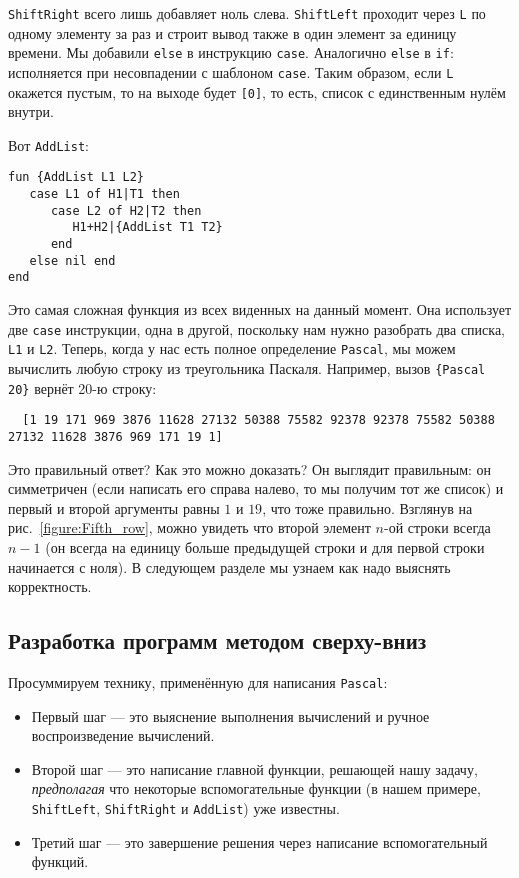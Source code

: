 \lstinline|ShiftRight| всего лишь добавляет ноль слева. \lstinline|ShiftLeft| проходит через \lstinline|L| по одному элементу за раз и строит вывод также в один элемент за единицу времени. Мы добавили \lstinline|else| в инструкцию \lstinline|case|. Аналогично \lstinline|else| в \lstinline|if|: исполняется при несовпадении с шаблоном \lstinline|case|. Таким образом, если \lstinline|L| окажется пустым, то на выходе будет \lstinline|[0]|, то есть, список с единственным нулём внутри.

Вот \lstinline|AddList|:

\begin{lstlisting}
fun {AddList L1 L2}
   case L1 of H1|T1 then
      case L2 of H2|T2 then
         H1+H2|{AddList T1 T2}
      end
   else nil end
end
\end{lstlisting}

Это самая сложная функция из всех виденных на данный момент. Она использует две \lstinline|case| инструкции, одна в другой, поскольку нам нужно разобрать два списка, \lstinline|L1| и \lstinline|L2|. Теперь, когда у нас есть полное определение \lstinline|Pascal|, мы можем вычислить любую строку из треугольника Паскаля. Например, вызов \lstinline|{Pascal 20}| вернёт 20-ю строку:

\begin{lstlisting}
  [1 19 171 969 3876 11628 27132 50388 75582 92378 92378 75582 50388 27132 11628 3876 969 171 19 1]
\end{lstlisting}

Это правильный ответ? Как это можно доказать? Он выглядит правильным: он симметричен (если написать его справа налево, то мы получим тот же список) и первый и второй аргументы равны $1$ и $19$, что тоже правильно. Взглянув на рис.~\ref{figure:Fifth_row}, можно увидеть что второй элемент $n$-ой строки всегда $n-1$ (он всегда на единицу больше предыдущей строки и для первой строки начинается с ноля). В следующем разделе мы узнаем как надо выяснять корректность.

\subsection{Разработка программ методом свер\-ху\--вниз}

Просуммируем технику, применённую для написания \lstinline|Pascal|:

\begin{itemize}
\item{Первый шаг --- это выяснение выполнения вычислений и ручное воспроизведение вычислений.}

\item{Второй шаг --- это написание главной функции, решающей нашу задачу, \emph{предполагая} что некоторые вспомогательные функции (в нашем примере, \lstinline|ShiftLeft|, \lstinline|ShiftRight| и \lstinline|AddList|) уже известны.}

\item{Третий шаг --- это завершение решения через написание вспомогательный функций.}
\end{itemize}


